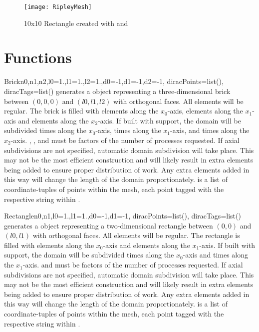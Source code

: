 \begin{figure}
\centerline{\texttt{[image: RipleyMesh]}}
\caption{10x10 \ripley Rectangle created with  and
}
\label{fig:ripleyrect}
\end{figure}

\section{Functions}\label{sec:ripleyfuncs}
\begin{funcdesc}{Brick}{n0,n1,n2,l0=1.,l1=1.,l2=1.,d0=-1,d1=-1,d2=-1,
diracPoints=list(), diracTags=list()}
generates a \Domain object representing a three-dimensional brick between
$(0,0,0)$ and $(l0,l1,l2)$ with orthogonal faces. All elements will be regular.
The brick is filled with
 elements along the $x_0$-axis,
 elements along the $x_1$-axis and
 elements along the $x_2$-axis.
If built with \MPI support, the domain will be subdivided 
 times along the $x_0$-axis,
 times along the $x_1$-axis, and
 times along the $x_2$-axis.
, , and  must be factors of the number of
\MPI processes requested.
If axial subdivisions are not specified, automatic domain subdivision will take
place. This may not be the most efficient construction and will likely result in
extra elements being added to ensure proper distribution of work. Any extra
elements added in this way will change the length of the domain proportionately.
 is a list of coordinate-tuples of points within the mesh,
each point tagged with the respective string within .
\end{funcdesc}

\begin{funcdesc}{Rectangle}{n0,n1,l0=1.,l1=1.,d0=-1,d1=-1,
diracPoints=list(), diracTags=list()}
generates a \Domain object representing a two-dimensional rectangle between
$(0,0)$ and $(l0,l1)$ with orthogonal faces. All elements will be regular.
The rectangle is filled with
 elements along the $x_0$-axis and
 elements along the $x_1$-axis.
If built with \MPI support, the domain will be subdivided 
 times along the $x_0$-axis and
 times along the $x_1$-axis.
 and  must be factors of the number of \MPI processes requested.
If axial subdivisions are not specified, automatic domain subdivision will take
place. This may not be the most efficient construction and will likely result in
extra elements being added to ensure proper distribution of work. Any extra
elements added in this way will change the length of the domain proportionately.
 is a list of coordinate-tuples of points within the mesh,
each point tagged with the respective string within .
\end{funcdesc}

